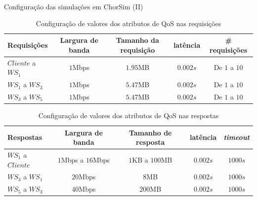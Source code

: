 \documentclass[xcolor=svgnames]{beamer}
\begin{document}
  \begin{frame}{Configuração das simulações em ChorSim (II)}  
      \begin{table}[!h]
	    \centering
      {\footnotesize
	    \caption{Configuração de valores dos atributos de QoS nas requisições}
	    \label{table:simulation_configuration_responses}
	  \begin{tabular}{|l|c|c|c|c|}
		\hline
		Requisições           &  Largura de banda     &   Tamanho da requisição    &  latência       &  \# requisições	  \\
		\hline
		$Cliente$ a $WS_1$    &    $1$Mbps	              &      $1.95$MB        &   $0.002s$      &    De $1$ a $10$     \\
		$WS_1$ a $WS_3$       &    $1$Mbps	              &      $5.47$MB        &   $0.002s$      &    De $1$ a $10$     \\
		$WS_3$ a $WS_5$       &    $1$Mbps                  &      $5.47$MB        &   $0.002s$      &    De $1$ a $10$     \\
		\hline
		\end{tabular}
      }
      \end{table}

      \begin{table}[!h]
	    \centering
      {\footnotesize
	    \caption{Configuração de valores dos atributos de QoS nas respostas}
	    \label{table:simulation_configuration_requests}
	  \begin{tabular}{|l|c|c|c|c|}
		\hline
		Respostas           &  Largura de banda           &   Tamanho de resposta    &  latência         &   \emph{timeout}	  \\
		\hline
		$WS_1$ a $Cliente$  &    $1$Mbps a $16$Mbps	        &    $1$KB a  $100$MB                   &   $0.002s$      &   $1000s$     \\
		$WS_3$ a $WS_1$     &    $20$Mbps	                &      $8$MB                   &   $0.002s$      &   $1000s$     \\
		$WS_5$ a $WS_3$     &    $40$Mbps                 &      $200$MB                 &   $0.002s$      &   $1000s$     \\
		\hline
		\end{tabular}
      }
      \end{table}
  \end{frame}
\end{document}
